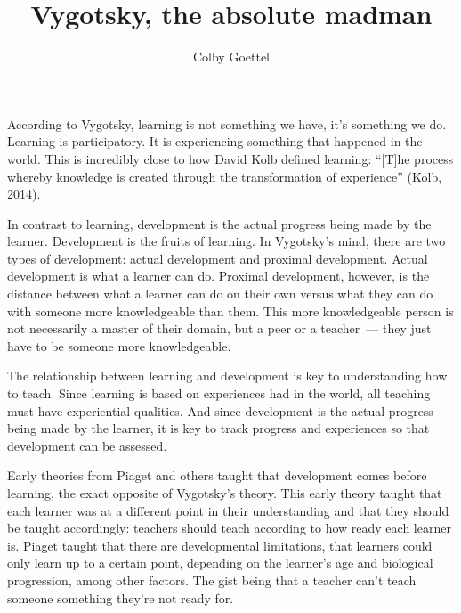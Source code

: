 \documentclass[12pt]{article}
\title{Vygotsky, the absolute madman}
\author{Colby Goettel}
\begin{document}
\maketitle


According to Vygotsky, learning is not something we have, it's something we do. Learning is participatory. It is experiencing something that happened in the world. This is incredibly close to how David Kolb defined learning: ``[T]he process whereby knowledge is created through the transformation of experience'' (Kolb, 2014).

In contrast to learning, development is the actual progress being made by the learner. Development is the fruits of learning. In Vygotsky's mind, there are two types of development: actual development and proximal development. Actual development is what a learner can do. Proximal development, however, is the distance between what a learner can do on their own versus what they can do with someone more knowledgeable than them. This more knowledgeable person is not necessarily a master of their domain, but a peer or a teacher~--- they just have to be someone more knowledgeable.

The relationship between learning and development is key to understanding how to teach. Since learning is based on experiences had in the world, all teaching must have experiential qualities. And since development is the actual progress being made by the learner, it is key to track progress and experiences so that development can be assessed.

Early theories from Piaget and others taught that development comes before learning, the exact opposite of Vygotsky's theory. This early theory taught that each learner was at a different point in their understanding and that they should be taught accordingly: teachers should teach according to how ready each learner is. Piaget taught that there are developmental limitations, that learners could only learn up to a certain point, depending on the learner's age and biological progression, among other factors. The gist being that a teacher can't teach someone something they're not ready for.
\end{document}
